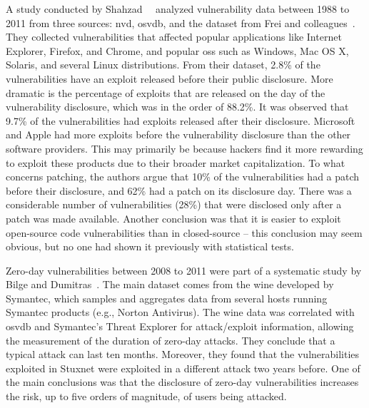 A study conducted by Shahzad~\etal{}~\cite{Shahzad:2012} analyzed vulnerability data between 1988 to 2011 from three sources: \gls{nvd}, \gls{osvdb}, and the dataset from Frei and colleagues~\cite{Frei:2006}.
They collected vulnerabilities that affected popular applications like Internet Explorer, Firefox, and Chrome, and popular \glspl{os} such as Windows, Mac OS X, Solaris, and several Linux distributions. 
From their dataset, 2.8\% of the vulnerabilities have an exploit released before their public disclosure. 
More dramatic is the percentage of exploits that are released on the day of the vulnerability disclosure, which was in the order of 88.2\%. 
It was observed that 9.7\% of the vulnerabilities had exploits released after their disclosure.
Microsoft and Apple had more exploits before the vulnerability disclosure than the other software providers. 
This may primarily be because hackers find it more rewarding to exploit these products due to their broader market capitalization.
To what concerns patching, the authors argue that 10\% of the vulnerabilities had a patch before their disclosure, and 62\% had a patch on its disclosure day. 
There was a considerable number of vulnerabilities (28\%) that were disclosed only after a patch was made available. 
Another conclusion was that it is easier to exploit open-source code vulnerabilities than in closed-source – this conclusion may seem obvious, but no one had shown it previously with statistical tests.

Zero-day vulnerabilities between 2008 to 2011 were part of a systematic study by Bilge and Dumitras~\cite{Bilge:2012}.
The main dataset comes from the \gls{wine} developed by Symantec, which samples and aggregates data from several hosts running Symantec products (e.g., Norton Antivirus).
The \gls{wine} data was correlated with \gls{osvdb} and Symantec's Threat Explorer for attack/exploit information, allowing the measurement of the duration of zero-day attacks.
They conclude that a typical attack can last ten months. 
Moreover, they found that the vulnerabilities exploited in Stuxnet were exploited in a different attack two years before.
One of the main conclusions was that the disclosure of zero-day vulnerabilities increases the risk, up to five orders of magnitude, of users being attacked.


